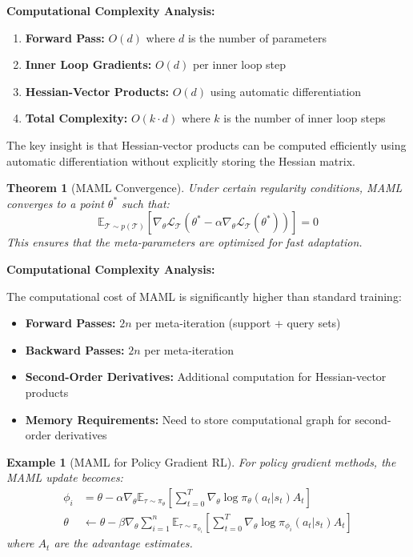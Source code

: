 \documentclass[12pt]{article}
\newcommand{\ieee}[1]{\textcolor{IEEEBlue}{\textbf{#1}}}
\newtheorem{theorem}{Theorem}
\newtheorem{example}{Example}
\begin{document}
{{			\ieee{Computational Complexity Analysis:}
			
			\begin{enumerate}
				\item \textbf{Forward Pass:} $O(d)$ where $d$ is the number of parameters
				\item \textbf{Inner Loop Gradients:} $O(d)$ per inner loop step
				\item \textbf{Hessian-Vector Products:} $O(d)$ using automatic differentiation
				\item \textbf{Total Complexity:} $O(k \cdot d)$ where $k$ is the number of inner loop steps
			\end{enumerate}
			
			The key insight is that Hessian-vector products can be computed efficiently using automatic differentiation without explicitly storing the Hessian matrix.
			
			\begin{theorem}[MAML Convergence]
			Under certain regularity conditions, MAML converges to a point $\theta^*$ such that:
			\begin{equation}
			\mathbb{E}_{\mathcal{T} \sim p(\mathcal{T})} \left[ \nabla_\theta \mathcal{L}_{\mathcal{T}}(\theta^* - \alpha \nabla_\theta \mathcal{L}_{\mathcal{T}}(\theta^*)) \right] = 0
			\end{equation}
			This ensures that the meta-parameters are optimized for fast adaptation.
			\end{theorem}
			
			\ieee{Computational Complexity Analysis:}
			
			The computational cost of MAML is significantly higher than standard training:
			
			\begin{itemize}
				\item \textbf{Forward Passes:} $2n$ per meta-iteration (support + query sets)
				\item \textbf{Backward Passes:} $2n$ per meta-iteration
				\item \textbf{Second-Order Derivatives:} Additional computation for Hessian-vector products
				\item \textbf{Memory Requirements:} Need to store computational graph for second-order derivatives
			\end{itemize}
			
			\begin{example}[MAML for Policy Gradient RL]
			For policy gradient methods, the MAML update becomes:
			\begin{align}
			\phi_i &= \theta - \alpha \nabla_\theta \mathbb{E}_{\tau \sim \pi_\theta} \left[ \sum_{t=0}^T \nabla_\theta \log \pi_\theta(a_t|s_t) A_t \right] \\
			\theta &\leftarrow \theta - \beta \nabla_\theta \sum_{i=1}^n \mathbb{E}_{\tau \sim \pi_{\phi_i}} \left[ \sum_{t=0}^T \nabla_\theta \log \pi_{\phi_i}(a_t|s_t) A_t \right]
			\end{align}
			where $A_t$ are the advantage estimates.
			\end{example}
			
}}
\end{document}
